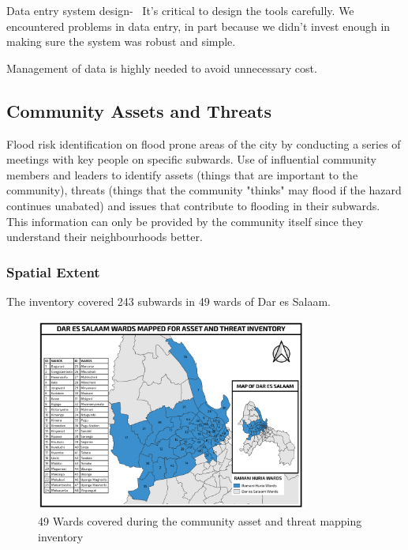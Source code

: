 \documentclass[a4paper,12pt,twoside]{article}
\begin{document}
{\color{RHblue}Data entry system design-}
\
It’s critical to design the tools carefully. We encountered problems in data entry, in part because we didn’t invest enough in making sure the system was robust and simple.

Management of data is highly needed to avoid unnecessary cost.

\newpage

\subsection{Community Assets and Threats}

\begin{multicols}{2}
Flood risk identification on flood prone areas of the city by conducting a series of meetings with key people on specific subwards. Use of influential community members and leaders to identify assets (things that are important to the community), threats (things that the community "thinks" may flood if the hazard continues unabated) and issues that contribute to flooding in their subwards. This information can only be provided by the community itself since they understand their neighbourhoods better.
\end{multicols}

\subsubsection{Spatial Extent}
The inventory covered  243 subwards in 49 wards of Dar es Salaam. 

\begin{figure}[h]
  \color{RHgreen}\caption{49 Wards covered during the community asset and threat mapping inventory}
  \centering
  \includegraphics[width=0.8\textwidth]{images/asset_and_threat_wards.png}
\end{figure}
\end{document}
